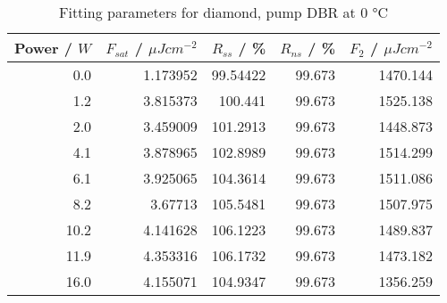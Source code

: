 \begin{table}[H]
\caption{Fitting parameters for diamond, pump DBR at $0$ °C}
\begin{tabular}{rrrrr}
\toprule
Power / $W$ & $F_{sat}$ / $\mu Jcm^{-2}$ & $R_{ss}$ / \% & $R_{ns}$ / \% & $F_2$ / $\mu Jcm^{-2}$ \\
\midrule
0.0 & 1.173952 & 99.54422 & 99.673 & 1470.144 \\
1.2 & 3.815373 & 100.441 & 99.673 & 1525.138 \\
2.0 & 3.459009 & 101.2913 & 99.673 & 1448.873 \\
4.1 & 3.878965 & 102.8989 & 99.673 & 1514.299 \\
6.1 & 3.925065 & 104.3614 & 99.673 & 1511.086 \\
8.2 & 3.67713 & 105.5481 & 99.673 & 1507.975 \\
10.2 & 4.141628 & 106.1223 & 99.673 & 1489.837 \\
11.9 & 4.353316 & 106.1732 & 99.673 & 1473.182 \\
16.0 & 4.155071 & 104.9347 & 99.673 & 1356.259 \\
\bottomrule
\end{tabular}
\end{table}

